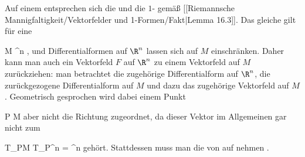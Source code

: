 {}
{

Auf einem
entsprechen sich die
und die
$1$-
gemäß
[[Riemannsche Mannigfaltigkeit/Vektorfelder und 1-Formen/Fakt|Lemma 16.3]].
Das gleiche gilt für eine

\mavergleichskette
{\vergleichskette
{ M
}
{ \subseteq }{ \R^n
}
{  }{
}
{    }{
}
{   }{
}
}
{}{}{,}
und Differentialformen auf $\R^n$ lassen sich auf $M$ einschränken. Daher kann man auch ein Vektorfeld $F$  auf $\R^n$ zu einem Vektorfeld auf $M$ zurückziehen: man betrachtet die zugehörige Differentialform auf $\R^n$, die zurückgezogene Differentialform auf $M$ und dazu das zugehörige Vektorfeld auf $M$. Geometrisch gesprochen wird dabei einem Punkt

\mavergleichskette
{\vergleichskette
{ P
}
{ \in }{ M
}
{  }{
}
{    }{
}
{   }{
}
}
{}{}{}
aber nicht die Richtung
 zugeordnet, da dieser Vektor im Allgemeinen gar nicht zum

\mavergleichskette
{\vergleichskette
{ T_PM
}
{ \subseteq }{ T_P\R^n
}
{ = }{ \R^n
}
{    }{
}
{   }{
}
}
{}{}{}
gehört. Stattdessen muss man die
von
 auf
 nehmen
 {} {.}

}

